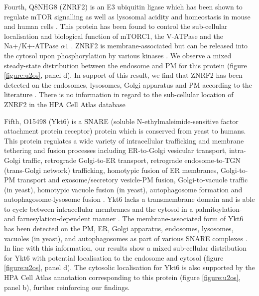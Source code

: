 \documentclass[12pt,english]{article}
\begin{document}
Fourth, Q8NHG8 (ZNRF2) is an E3 ubiquitin ligase which has been shown to regulate mTOR signalling as well as lysosomal acidity and homeostasis in mouse and human cells \citep{Hoxhaj:2016}. This protein has been found to control the sub-cellular localisation and biological function of mTORC1, the V-ATPase and the Na+/K+-ATPase $\alpha1$ \citep{Hoxhaj::2012, Hoxhaj:2016}. ZNRF2 is membrane-associated but can be released into the cytosol upon phosphorylation by various kinases \citep{Hoxhaj:2016}. We observe a mixed steady-state distribution between the endosome and PM for this protein (figure \ref{figure:u2os}, panel d). In support of this result, we find that ZNRF2 has been detected on the endosomes, lysosomes, Golgi apparatus and PM according to the literature \citep{Araki:2003, Hoxhaj:2016}. There is no information in regard to the sub-cellular location of ZNRF2 in the HPA Cell Atlas database 

Fifth, O15498 (Ykt6) is a SNARE (soluble N-ethylmaleimide-sensitive factor attachment protein receptor) protein which is conserved from yeast to humans. This protein regulates a wide variety of intracellular trafficking and membrane tethering and fusion processes including ER-to-Golgi vesicular transport, intra-Golgi traffic, retrograde Golgi-to-ER transport, retrograde endosome-to-TGN (trans-Golgi network) trafficking, homotypic fusion of ER membranes, Golgi-to-PM transport and exosome/secretory vesicle-PM fusion, Golgi-to-vacuole traffic (in yeast), homotypic vacuole fusion (in yeast), autophagosome formation and autophagosome-lysosome fusion \citep{Dilcher::2001, Tai:2004, Takats::2018, Matsui::2018, Linnemannstons::2018, Yong::2019}. Ykt6 lacks a transmembrane domain and is able to cycle between intracellular membranes and the cytosol in a palmitoylation- and farnesylation-dependent manner \citep{Fukasawa::2004,Meiringer::2008}. The membrane-associated form of Ykt6 has been detected on the PM, ER, Golgi apparatus, endosomes, lysosomes, vacuoles (in yeast), and autophagosomes as part of various SNARE complexes \citep{Dilcher::2001, Tai:2004,Fukasawa::2004,Meiringer::2008, Takats::2018, Matsui::2018, Linnemannstons::2018, Yong::2019}. In line with this information, our results show a mixed sub-cellular distribution for Ykt6 with potential localisation to the endosome and cytosol (figure \ref{figure:u2os}, panel d). The cytosolic localisation for Ykt6 is also supported by the HPA Cell Atlas annotation corresponding to this protein (figure \ref{figure:u2os}, panel b), further reinforcing our findings.
\end{document}
